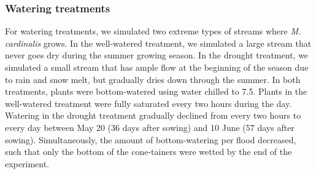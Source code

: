 \documentclass[11pt, oneside]{article}
\begin{document}
\subsubsection*{Watering treatments}

For watering treatments, we simulated two extreme types of streams where \textit{M. cardinalis} grows. In the well-watered treatment, we simulated a large stream that never goes dry during the summer growing season. In the drought treatment, we simulated a small stream that has ample flow at the beginning of the season due to rain and snow melt, but gradually dries down through the summer. In both treatments, plants were bottom-watered using  water chilled to 7.5\celsius. Plants in the well-watered treatment were fully saturated every two hours during the day. Watering in the drought treatment gradually declined from every two hours to every day between May 20 (36 days after sowing) and 10 June (57 days after sowing). Simultaneously, the amount of bottom-watering per flood decreased, such that only the bottom of the cone-tainers were wetted by the end of the experiment.
\end{document}
